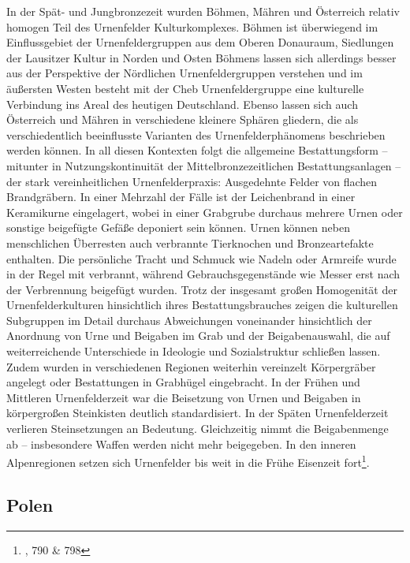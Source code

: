 \documentclass[openany,twoside,twocolumn]{book}
\let\rmarkdownfootnote\footnote%
\def\footnote{\protect\rmarkdownfootnote}
\begin{document}
In der Spät- und Jungbronzezeit wurden Böhmen, Mähren und Österreich
relativ homogen Teil des Urnenfelder Kulturkomplexes. Böhmen ist
überwiegend im Einflussgebiet der Urnenfeldergruppen aus dem Oberen
Donauraum, Siedlungen der Lausitzer Kultur in Norden und Osten Böhmens
lassen sich allerdings besser aus der Perspektive der Nördlichen
Urnenfeldergruppen verstehen und im äußersten Westen besteht mit der
Cheb Urnenfeldergruppe eine kulturelle Verbindung ins Areal des heutigen
Deutschland. Ebenso lassen sich auch Österreich und Mähren in
verschiedene kleinere Sphären gliedern, die als verschiedentlich
beeinflusste Varianten des Urnenfelderphänomens beschrieben werden
können. In all diesen Kontexten folgt die allgemeine Bestattungsform --
mitunter in Nutzungskontinuität der Mittelbronzezeitlichen
Bestattungsanlagen -- der stark vereinheitlichen Urnenfelderpraxis:
Ausgedehnte Felder von flachen Brandgräbern. In einer Mehrzahl der Fälle
ist der Leichenbrand in einer Keramikurne eingelagert, wobei in einer
Grabgrube durchaus mehrere Urnen oder sonstige beigefügte Gefäße
deponiert sein können. Urnen können neben menschlichen Überresten auch
verbrannte Tierknochen und Bronzeartefakte enthalten. Die persönliche
Tracht und Schmuck wie Nadeln oder Armreife wurde in der Regel mit
verbrannt, während Gebrauchsgegenstände wie Messer erst nach der
Verbrennung beigefügt wurden. Trotz der insgesamt großen Homogenität der
Urnenfelderkulturen hinsichtlich ihres Bestattungsbrauches zeigen die
kulturellen Subgruppen im Detail durchaus Abweichungen voneinander
hinsichtlich der Anordnung von Urne und Beigaben im Grab und der
Beigabenauswahl, die auf weiterreichende Unterschiede in Ideologie und
Sozialstruktur schließen lassen. Zudem wurden in verschiedenen Regionen
weiterhin vereinzelt Körpergräber angelegt oder Bestattungen in
Grabhügel eingebracht. In der Frühen und Mittleren Urnenfelderzeit war
die Beisetzung von Urnen und Beigaben in körpergroßen Steinkisten
deutlich standardisiert. In der Späten Urnenfelderzeit verlieren
Steinsetzungen an Bedeutung. Gleichzeitig nimmt die Beigabenmenge ab --
insbesondere Waffen werden nicht mehr beigegeben. In den inneren
Alpenregionen setzen sich Urnenfelder bis weit in die Frühe Eisenzeit
fort\footnote{\textcite{lubos_czech_2013}, 790 \& 798}.

\hypertarget{polen}{%
\subsection{Polen}\label{polen}}
\end{document}
